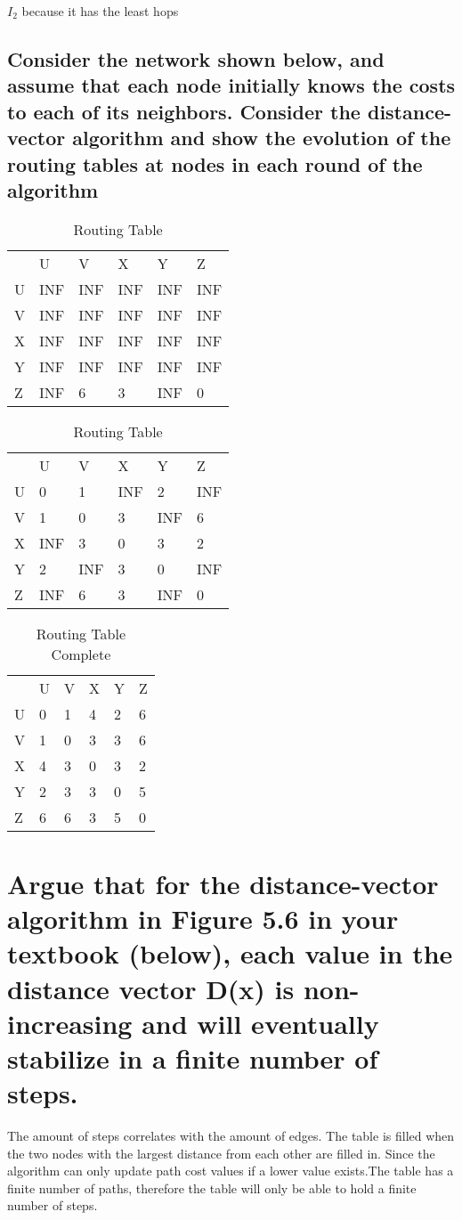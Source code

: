 \documentclass[10pt,letterpaper]{article}
\begin{document}
$I_{2}$ because it has the least hops


\subsection{Consider the network shown below, and assume that each node initially knows the costs to each of its neighbors.  Consider the distance-vector algorithm and show the evolution of the routing tables at nodes in each round of the algorithm}

\begin{table}[h]
\centering
\caption{Routing Table}
\label{my-label}
\begin{tabular}{llllll}
  & U   & V   & X   & Y   & Z   \\
U & INF & INF & INF & INF & INF \\
V & INF & INF & INF & INF & INF \\
X & INF & INF & INF & INF & INF \\
Y & INF & INF & INF & INF & INF \\
Z & INF & 6   & 3   & INF & 0  
\end{tabular}
\end{table}

\begin{table}[h]
\centering
\caption{Routing Table}
\label{my-label}
\begin{tabular}{llllll}
  & U   & V   & X   & Y   & Z   \\
U & 0   & 1   & INF & 2   & INF \\
V & 1   & 0   & 3   & INF & 6   \\
X & INF & 3   & 0   & 3   & 2   \\
Y & 2   & INF & 3   & 0   & INF \\
Z & INF & 6   & 3   & INF & 0  
\end{tabular}
\end{table}

\begin{table}[h]
\centering
\caption{Routing Table Complete}
\label{my-label}
\begin{tabular}{llllll}
  & U & V & X & Y & Z \\
U & 0 & 1 & 4 & 2 & 6 \\
V & 1 & 0 & 3 & 3 & 6 \\
X & 4 & 3 & 0 & 3 & 2 \\
Y & 2 & 3 & 3 & 0 & 5 \\
Z & 6 & 6 & 3 & 5 & 0
\end{tabular}
\end{table}

\section{Argue that for the distance-vector algorithm in Figure 5.6 in your textbook (below), each value in the distance vector D(x) is non-increasing and will eventually stabilize in a finite number of steps.}
The amount of steps correlates with the amount of edges. The table is filled when the two nodes with the largest distance from each other are filled in. Since the algorithm can only update path cost values if a lower value exists.The table has a finite number of paths, therefore the table will only be able to hold a finite number of steps.
\end{document}
